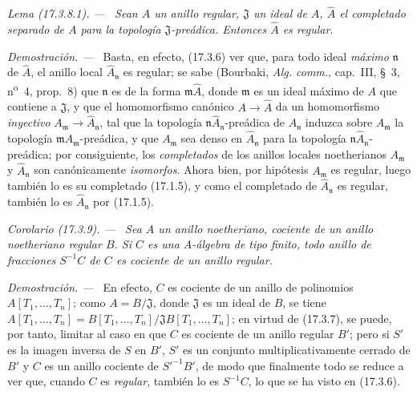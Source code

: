 \documentclass[10pt,oneside]{book}
\makeatletter
\newcommand{\setmanualcurrentlabel}[1]{\def\@currentlabel{#1}}
\newcommand{\oldpage}[2][]{%
  \setcounter{footnote}{0}%
  \marginpar{\scriptsize\textbf{#1}~|~#2}\ignorespaces}
\newenvironment{corollary}[1][]{%
  \setmanualcurrentlabel{#1}\par\medskip\noindent\itshape Corolario (#1). ---\ }{\par}
\newenvironment{lemma}[1][]{%
  \setmanualcurrentlabel{#1}\par\medskip\noindent\itshape Lema (#1). ---\ }{\par}
\newenvironment{proof}{%
  \par\medskip\noindent\textit{Demostración. ---\ }}{\par}
\makeatother
\begin{document}
\begin{lemma}[17.3.8.1]
\label{0.17.3.8.1-es}
Sean $A$ un anillo regular, $\mathfrak{J}$ un ideal de $A$,
$\widehat{A}$ el completado separado de $A$ para la topología
$\mathfrak{J}$-preádica. Entonces $\widehat{A}$ es regular.
\end{lemma}

\begin{proof}
Basta, en efecto, (17.3.6) ver que, para todo ideal \emph{máximo}
$\mathfrak{n}$ de $\widehat{A}$, el anillo local
$\widehat{A}_{\mathfrak{n}}$ es regular; se sabe (Bourbaki,
\emph{Alg. comm.}, cap.~III, \S~3, n\textsuperscript{o}~4, prop.~8) que
$\mathfrak{n}$
\oldpage[0\textsubscript{IV-1}]{51}
es de la forma $\mathfrak{m}\widehat{A}$, donde $\mathfrak{m}$ es un ideal
máximo de $A$ que contiene a $\mathfrak{J}$, y que el homomorfismo canónico
$A\to\widehat{A}$ da un homomorfismo \emph{inyectivo}
$A_{\mathfrak{m}}\to\widehat{A}_{\mathfrak{n}}$, tal que la topología
$\mathfrak{n}\widehat{A}_{\mathfrak{n}}$-preádica de
$\widehat{A}_{\mathfrak{n}}$ induzca sobre $A_{\mathfrak{m}}$ la topología
$\mathfrak{m}A_{\mathfrak{m}}$-preádica, y que $A_{\mathfrak{m}}$ sea denso
en $\widehat{A}_{\mathfrak{n}}$ para la topología
$\mathfrak{n}\widehat{A}_{\mathfrak{n}}$-preádica; por consiguiente, los
\emph{completados} de los anillos locales noetherianos $A_{\mathfrak{m}}$ y
$\widehat{A}_{\mathfrak{n}}$ son canónicamente \emph{isomorfos}. Ahora bien,
por hipótesis $A_{\mathfrak{m}}$ es regular, luego también lo es su completado
(17.1.5), y como el completado de $\widehat{A}_{\mathfrak{n}}$ es regular,
también lo es $\widehat{A}_{\mathfrak{n}}$ por (17.1.5).
\end{proof}

\begin{corollary}[17.3.9]
\label{0.17.3.9-es}
Sea $A$ un anillo noetheriano, cociente de un anillo noetheriano regular $B$.
Si $C$ es una $A$-álgebra de tipo finito, todo anillo de fracciones $S^{-1}C$
de $C$ es cociente de un anillo regular.
\end{corollary}

\begin{proof}
En efecto, $C$ es cociente de un anillo de polinomios $A[T_1,\ldots,T_n]$;
como $A=B/\mathfrak{J}$, donde $\mathfrak{J}$ es un ideal de $B$, se tiene
$A[T_1,\ldots,T_n]=B[T_1,\ldots,T_n]/\mathfrak{J}B[T_1,\ldots,T_n]$; en
virtud de (17.3.7), se puede, por tanto, limitar al caso en que $C$ es cociente
de un anillo regular $B'$; pero si $S'$ es la imagen inversa de $S$ en $B'$,
$S'$ es un conjunto multiplicativamente cerrado de $B'$ y $C$ es un anillo
cociente de $S'^{-1}B'$, de modo que finalmente todo se reduce a ver que,
cuando $C$ es \emph{regular}, también lo es $S^{-1}C$, lo que se ha visto en
(17.3.6).
\end{proof}
\end{document}
